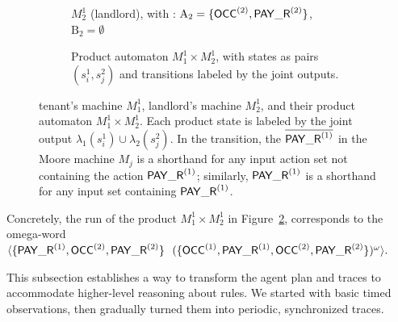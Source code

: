 \begin{example}
\begin{figure}[h]
\begin{subfigure}[t]{0.70\textwidth}
{}
  \caption{$M_2^1$ (landlord), with : $\mathrm{A_2}=\{\mathsf{OCC}^{(2)},\mathsf{PAY\_R}^{(2)}\}$, $\mathrm{B_2}=\emptyset$}
  \label{fig:moore-landlord-prods}
  \end{subfigure}
  \vspace{0.5cm}
  \begin{subfigure}[t]{0.70\textwidth}
  \centering
  \caption{Product automaton $M_1^1 \times M_2^1$, with states as pairs $(s_i^1,s_j^2)$ and transitions labeled by the joint outputs.}
  \label{fig:product-sketch}
  \end{subfigure}
  
  \caption{tenant’s machine $M_1^1$, landlord’s machine $M_2^1$, and their product 
  automaton $M_1^1 \times M_2^1$. 
  Each product state is labeled by the joint output $\lambda_1(s_i^1)\cup\lambda_2(s_j^2)$.
  In the transition, the $\overline{\mathsf{PAY\_R}^{(1)}}$ in the Moore machine $M_j$ is a shorthand for any input action set not containing the action $\mathsf{PAY\_R}^{(1)}$; similarly, $\mathsf{PAY\_R}^{(1)}$ is a shorthand for any input set containing $\mathsf{PAY\_R}^{(1)}$.} 
  \label{fig:moore-product-full}
  \end{figure}
  
  \noindent
  Concretely, the run of the product $M_1^1 \times M_2^1$ in  Figure~\ref{fig:product-sketch}, corresponds to the omega-word\\
  $\langle \{\mathsf{PAY\_R}^{(1)},\mathsf{OCC}^{(2)},\mathsf{PAY\_R}^{(2)}\}~\
   (\{\mathsf{OCC}^{(1)},\mathsf{PAY\_R}^{(1)},\mathsf{OCC}^{(2)},\mathsf{PAY\_R}^{(2)}\})^\omega \rangle .$
  \end{example}
  This subsection establishes a way to transform the agent plan and traces to accommodate higher-level reasoning about rules. We started with basic timed observations, then gradually turned them into periodic, synchronized traces.


